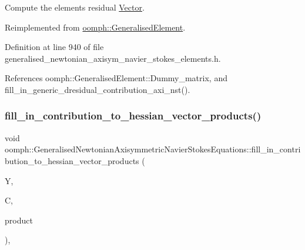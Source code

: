 Compute the element\textquotesingle{}s residual \hyperlink{classoomph_1_1Vector}{Vector}. 



Reimplemented from \hyperlink{classoomph_1_1GeneralisedElement_a64d31806fcbe7c5b689a3281932e8073}{oomph\+::\+Generalised\+Element}.



Definition at line 940 of file generalised\+\_\+newtonian\+\_\+axisym\+\_\+navier\+\_\+stokes\+\_\+elements.\+h.



References oomph\+::\+Generalised\+Element\+::\+Dummy\+\_\+matrix, and fill\+\_\+in\+\_\+generic\+\_\+dresidual\+\_\+contribution\+\_\+axi\+\_\+nst().

\mbox{\label{classoomph_1_1GeneralisedNewtonianAxisymmetricNavierStokesEquations_a2087bbf2d46364b9dc414a7ca90f25de}} 
\subsubsection{\texorpdfstring{fill\+\_\+in\+\_\+contribution\+\_\+to\+\_\+hessian\+\_\+vector\+\_\+products()}{fill\_in\_contribution\_to\_hessian\_vector\_products()}}
{\footnotesize\ttfamily void oomph\+::\+Generalised\+Newtonian\+Axisymmetric\+Navier\+Stokes\+Equations\+::fill\+\_\+in\+\_\+contribution\+\_\+to\+\_\+hessian\+\_\+vector\+\_\+products (\begin{DoxyParamCaption}\item[{\hyperlink{classoomph_1_1Vector}{Vector}$<$ double $>$ const \&}]{Y,  }\item[{\hyperlink{classoomph_1_1DenseMatrix}{Dense\+Matrix}$<$ double $>$ const \&}]{C,  }\item[{\hyperlink{classoomph_1_1DenseMatrix}{Dense\+Matrix}$<$ double $>$ \&}]{product }\end{DoxyParamCaption})\hspace{0.3cm}{\ttfamily [protected]}, {\ttfamily [virtual]}}



